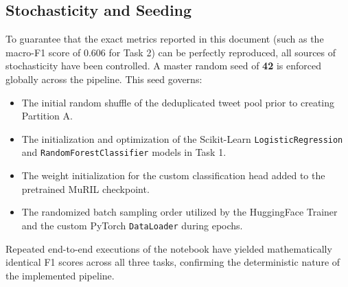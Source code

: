 \subsection*{Stochasticity and Seeding}
To guarantee that the exact metrics reported in this document (such as the macro-F1 score of 0.606 for Task 2) can be perfectly reproduced, all sources of stochasticity have been controlled. A master random seed of \textbf{42} is enforced globally across the pipeline. This seed governs:
\begin{itemize}
    \item The initial random shuffle of the deduplicated tweet pool prior to creating Partition A.
    \item The initialization and optimization of the Scikit-Learn \texttt{LogisticRegression} and \texttt{RandomForestClassifier} models in Task 1.
    \item The weight initialization for the custom classification head added to the pretrained MuRIL checkpoint.
    \item The randomized batch sampling order utilized by the HuggingFace Trainer and the custom PyTorch \texttt{DataLoader} during epochs.
\end{itemize}
Repeated end-to-end executions of the notebook have yielded mathematically identical F1 scores across all three tasks, confirming the deterministic nature of the implemented pipeline.